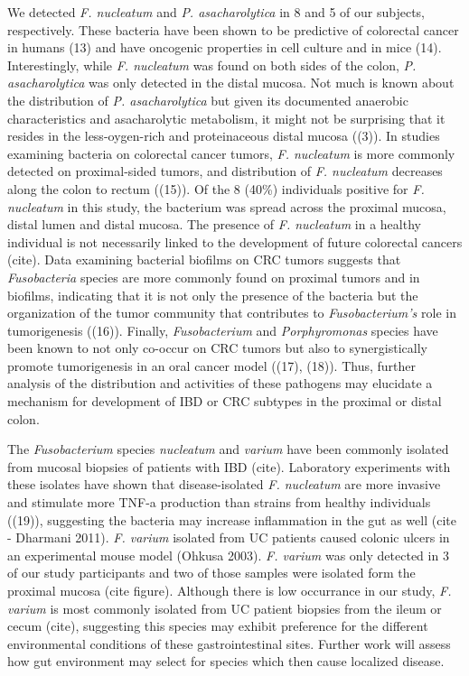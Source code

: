 \documentclass[11pt,]{article}
\begin{document}
We detected \emph{F. nucleatum} and \emph{P. asacharolytica} in 8 and 5
of our subjects, respectively. These bacteria have been shown to be
predictive of colorectal cancer in humans (13) and have oncogenic
properties in cell culture and in mice (14). Interestingly, while
\emph{F. nucleatum} was found on both sides of the colon, \emph{P.
asacharolytica} was only detected in the distal mucosa. Not much is
known about the distribution of \emph{P. asacharolytica} but given its
documented anaerobic characteristics and asacharolytic metabolism, it
might not be surprising that it resides in the less-oygen-rich and
proteinaceous distal mucosa ((3)). In studies examining bacteria on
colorectal cancer tumors, \emph{F. nucleatum} is more commonly detected
on proximal-sided tumors, and distribution of \emph{F. nucleatum}
decreases along the colon to rectum ((15)). Of the 8 (40\%) individuals
positive for \emph{F. nucleatum} in this study, the bacterium was spread
across the proximal mucosa, distal lumen and distal mucosa. The presence
of \emph{F. nucleatum} in a healthy individual is not necessarily linked
to the development of future colorectal cancers (cite). Data examining
bacterial biofilms on CRC tumors suggests that \emph{Fusobacteria}
species are more commonly found on proximal tumors and in biofilms,
indicating that it is not only the presence of the bacteria but the
organization of the tumor community that contributes to
\emph{Fusobacterium's} role in tumorigenesis ((16)). Finally,
\emph{Fusobacterium} and \emph{Porphyromonas} species have been known to
not only co-occur on CRC tumors but also to synergistically promote
tumorigenesis in an oral cancer model ((17), (18)). Thus, further
analysis of the distribution and activities of these pathogens may
elucidate a mechanism for development of IBD or CRC subtypes in the
proximal or distal colon.

The \emph{Fusobacterium} species \emph{nucleatum} and \emph{varium} have
been commonly isolated from mucosal biopsies of patients with IBD
(cite). Laboratory experiments with these isolates have shown that
disease-isolated \emph{F. nucleatum} are more invasive and stimulate
more TNF-a production than strains from healthy individuals ((19)),
suggesting the bacteria may increase inflammation in the gut as well
(cite - Dharmani 2011). \emph{F. varium} isolated from UC patients
caused colonic ulcers in an experimental mouse model (Ohkusa 2003).
\emph{F. varium} was only detected in 3 of our study participants and
two of those samples were isolated form the proximal mucosa (cite
figure). Although there is low occurrance in our study, \emph{F. varium}
is most commonly isolated from UC patient biopsies from the ileum or
cecum (cite), suggesting this species may exhibit preference for the
different environmental conditions of these gastrointestinal sites.
Further work will assess how gut environment may select for species
which then cause localized disease.
\end{document}
